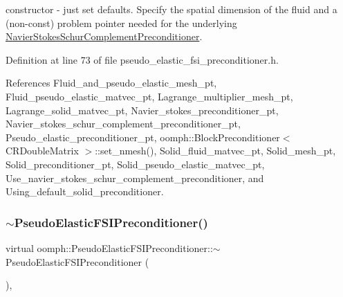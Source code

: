 constructor -\/ just set defaults. Specify the spatial dimension of the fluid and a (non-\/const) problem pointer needed for the underlying \hyperlink{classoomph_1_1NavierStokesSchurComplementPreconditioner}{Navier\+Stokes\+Schur\+Complement\+Preconditioner}. 



Definition at line 73 of file pseudo\+\_\+elastic\+\_\+fsi\+\_\+preconditioner.\+h.



References Fluid\+\_\+and\+\_\+pseudo\+\_\+elastic\+\_\+mesh\+\_\+pt, Fluid\+\_\+pseudo\+\_\+elastic\+\_\+matvec\+\_\+pt, Lagrange\+\_\+multiplier\+\_\+mesh\+\_\+pt, Lagrange\+\_\+solid\+\_\+matvec\+\_\+pt, Navier\+\_\+stokes\+\_\+preconditioner\+\_\+pt, Navier\+\_\+stokes\+\_\+schur\+\_\+complement\+\_\+preconditioner\+\_\+pt, Pseudo\+\_\+elastic\+\_\+preconditioner\+\_\+pt, oomph\+::\+Block\+Preconditioner$<$ C\+R\+Double\+Matrix $>$\+::set\+\_\+nmesh(), Solid\+\_\+fluid\+\_\+matvec\+\_\+pt, Solid\+\_\+mesh\+\_\+pt, Solid\+\_\+preconditioner\+\_\+pt, Solid\+\_\+pseudo\+\_\+elastic\+\_\+matvec\+\_\+pt, Use\+\_\+navier\+\_\+stokes\+\_\+schur\+\_\+complement\+\_\+preconditioner, and Using\+\_\+default\+\_\+solid\+\_\+preconditioner.

\mbox{\label{classoomph_1_1PseudoElasticFSIPreconditioner_a8f57b2dc7f9e37d419ead6b786dfac82}} 
\subsubsection{\texorpdfstring{$\sim$\+Pseudo\+Elastic\+F\+S\+I\+Preconditioner()}{~PseudoElasticFSIPreconditioner()}}
{\footnotesize\ttfamily virtual oomph\+::\+Pseudo\+Elastic\+F\+S\+I\+Preconditioner\+::$\sim$\+Pseudo\+Elastic\+F\+S\+I\+Preconditioner (\begin{DoxyParamCaption}{ }\end{DoxyParamCaption})\hspace{0.3cm}{\ttfamily [inline]}, {\ttfamily [virtual]}}



